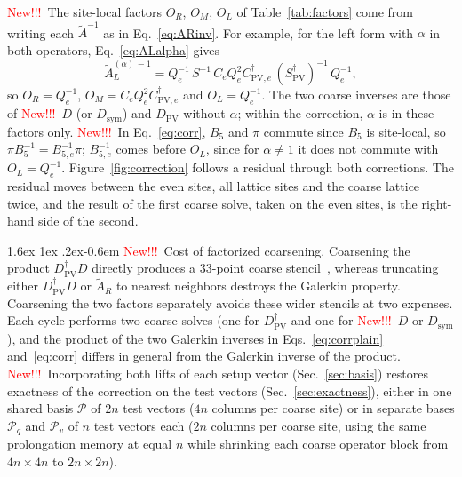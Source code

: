 \documentclass[11pt,a4paper]{article}
\makeatletter
\newif\ifshownew \shownewtrue
\DeclareRobustCommand\New{\ifshownew\textcolor{red}{New!!!}\ \else\ignorespaces\fi}
\renewcommand\paragraph{\@startsection{paragraph}{4}{\z@}%
  {1.6ex \@plus 1ex \@minus .2ex}{-0.6em}%
  {\normalfont\normalsize\itshape}}
\numberwithin{equation}{section}
\newcommand{\dg}{^{\dagger}}
\newcommand{\Dpv}{D_{\mathrm{PV}}}
\newcommand{\Spv}{S_{\mathrm{PV}}}
\newcommand{\AR}{\tilde A_{R}}
\newcommand{\AL}{\tilde A_{L}}
\newcommand{\Pro}{\mathcal P}
\newcommand{\Pq}{\Pro_q}
\newcommand{\Pv}{\Pro_v}
\newcommand{\Dsym}{D_{\mathrm{sym}}}
\newcommand{\Ce}{C_{e}}
\newcommand{\Cpve}{C_{\mathrm{PV},e}}
\makeatother
\begin{document}
\New The site-local factors $O_R$, $O_M$, $O_L$ of Table~\ref{tab:factors} come from
writing each $\tilde A^{-1}$ as in Eq.~\eqref{eq:ARinv}. For example, for the left form with
$\alpha$ in both operators, Eq.~\eqref{eq:ALalpha} gives
\begin{equation}
\AL^{(\alpha)\,-1}=Q_e^{-1}\,S^{-1}\,\Ce Q_e^2\Cpve\dg\,(\Spv\dg)^{-1}\,Q_e^{-1},
\end{equation}
so $O_R=Q_e^{-1}$, $O_M=\Ce Q_e^2\Cpve\dg$ and $O_L=Q_e^{-1}$. The two coarse inverses are those
of \New $D$ (or $\Dsym$) and $\Dpv$ without $\alpha$; within the correction, $\alpha$ is in these
factors only. \New In Eq.~\eqref{eq:corr}, $B_5$ and $\pi$ commute since $B_5$ is site-local, so
$\pi B_5^{-1}=B_{5,e}^{-1}\pi$; $B_{5,e}^{-1}$ comes before $O_L$, since for $\alpha\neq1$ it does
not commute with $O_L=Q_e^{-1}$. Figure~\ref{fig:correction} follows a residual through both
corrections. The residual moves between the even sites, all lattice sites and
the coarse lattice twice, and the result of the first coarse solve, taken on the even sites, is the
right-hand side of the second.

\paragraph{\New Cost of factorized coarsening.} Coarsening the product
$\Dpv\dg D$ directly produces a $33$-point coarse stencil~\cite{BoyleOare}, whereas truncating
either $\Dpv\dg D$ or $\AR$ to nearest neighbors destroys the Galerkin property. Coarsening the two
factors separately avoids these wider stencils at two expenses. Each cycle performs two coarse
solves (one for $\Dpv\dg$ and one for \New $D$ or $\Dsym$), and the product of the two Galerkin
inverses in Eqs.~\eqref{eq:corrplain} and~\eqref{eq:corr} differs in general from the Galerkin
inverse of the product. \New Incorporating both lifts of each setup vector (Sec.~\ref{sec:basis})
restores exactness of the correction on the test vectors (Sec.~\ref{sec:exactness}), either in one
shared basis $\Pro$ of $2n$ test vectors ($4n$ columns per coarse site) or in separate bases $\Pq$
and $\Pv$ of $n$ test vectors each ($2n$ columns per coarse site, using the same prolongation
memory at equal $n$ while shrinking each coarse operator block from $4n\times4n$ to $2n\times2n$).
\end{document}

